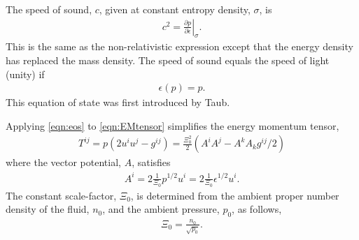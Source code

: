 \documentclass[10pt, fleqn,final,showtrims,oldfontcommands, article,a4paper,oneside]{memoir} %
\newcommand{\eqal}[2]{\begin{align}#1\label{eqn:#2}\end{align}}
\newcommand{\eqnref}[1]{\ref{eqn:#1}}
\newcommand{\epsillon}{\epsilon}
\newcommand{\scalefactor}{\Xi_0}
\newcommand{\lr}[1]{\left( #1 \right)}
\renewcommand{\d}{\partial}
\newcommand{\given}[2]{ \left.{#1}\right|_{#2}  }
\begin{document}
The speed of sound, $c$,  given at constant entropy density, $\sigma$, is\cite{LandauBook,Taub1978} 
\begin{align}
  c^2 = \given{\frac{\d p}{\d \epsillon}}{\sigma}. \label{eqn:soundspeed}
\end{align}
This is the same as the non-relativistic expression except that the energy density has replaced the mass density.
The speed of sound equals the speed of light (unity) if 
\eqal{
  \epsilon(p) = p.
}{eos}
This equation of state was first introduced by Taub\cite{Taub1978}.




Applying \eqnref{eos} to \eqnref{EMtensor} simplifies the energy momentum tensor,
\eqal{
  T^{i j}  = p\lr{2 u^i u^j - g^{i j}} = \frac{\scalefactor^2}{2 } \lr{ A^i A^j - A^k A_k g^{i j}/2} 
}{EMFluid}
where the vector potential, $A$,  satisfies
\eqal{
  A^i = 2\tfrac{1}{\scalefactor}p^{1/2}u^i =2 \tfrac{1}{\scalefactor} \epsilon^{1/2} u^i.
}{defnA}
The constant scale-factor, $\scalefactor$, is determined from the ambient proper number density of the fluid, $n_0$, and the ambient pressure, $p_0$, as follows,
\begin{align}
\scalefactor = \frac{n_0}{\sqrt{p_0}}. 
\label{eqn:scalefactor}
\end{align}
\end{document}
